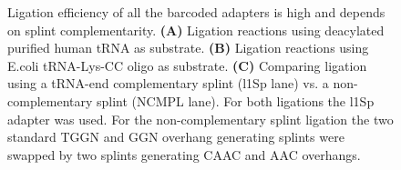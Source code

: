 \begin{figure}[ht]
    \centering
    \caption[Splint assisted ligation is highly efficient.]{
    Ligation efficiency of all the barcoded adapters is high and depends on splint complementarity.
    \textbf{(A)} Ligation reactions using deacylated purified human tRNA as substrate.
    \textbf{(B)} Ligation reactions using E.coli tRNA-Lys-CC oligo as substrate.
    \textbf{(C)} Comparing ligation using a tRNA-end complementary splint (l1Sp lane) vs. a non-complementary splint (NCMPL lane).
    For both ligations the l1Sp adapter was used.
    For the non-complementary splint ligation the two standard TGGN and GGN overhang generating splints were swapped by two splints generating CAAC and AAC overhangs.
    }
    \label{ch5:figsupp:f2S4}
\end{figure}


